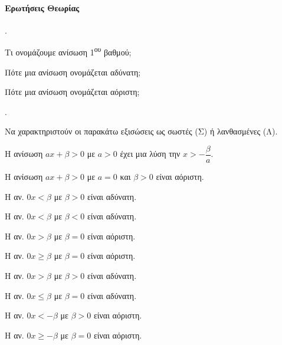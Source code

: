\documentclass[11pt,a4paper,twocolumn]{article}
\newcounter{askhsh}
\newcommand{\askhsh}{\large\theaskhsh.\ \addtocounter{askhsh}{1}}
\begin{document}
\paragraph{Ερωτήσεις Θεωρίας}
\askhsh 
\begin{alist}
\item Τι ονομάζουμε ανίσωση 1\textsuperscript{ου} βαθμού;
\item Πότε μια ανίσωση ονομάζεται αδύνατη;
\item Πότε μια ανίσωση ονομάζεται αόριστη;
\end{alist}
\askhsh Να χαρακτηριστούν οι παρακάτω εξισώσεις ως σωστές (Σ) ή λανθασμένες (Λ).
\begin{alist}[label=\roman*.]
\item Η ανίσωση $ ax+\beta>0 $ με $ a>0 $ έχει μια λύση την $ x>-\dfrac{\beta}{a} $.
\item Η ανίσωση $ ax+\beta>0 $ με $ a=0 $ και $ \beta>0 $ είναι αόριστη.
\item Η αν. $ 0x<\beta $ με $ \beta>0 $ είναι αδύνατη.
\item Η αν. $ 0x<\beta $ με $ \beta<0 $ είναι αδύνατη.
\item Η αν. $ 0x>\beta $ με $ \beta=0 $ είναι αόριστη.
\item Η αν. $ 0x\geq\beta $ με $ \beta=0 $ είναι αόριστη.
\item Η αν. $ 0x>\beta $ με $ \beta>0 $ είναι αδύνατη.
\item Η αν. $ 0x\leq\beta $ με $ \beta=0 $ είναι αδύνατη.
\item Η αν. $ 0x<-\beta $ με $ \beta>0 $ είναι αόριστη.
\item Η αν. $ 0x\geq-\beta $ με $ \beta=0 $ είναι αόριστη.
\end{alist}
\end{document}

